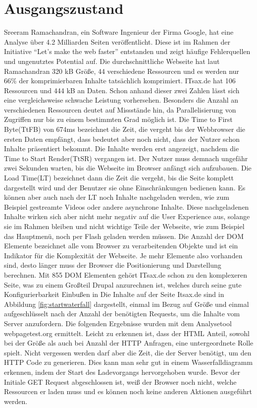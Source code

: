 \section{Ausgangszustand}  
Sreeram Ramachandran, ein Software Ingenieur der Firma Google, hat eine Analyse über 4.2 Milliarden Seiten veröffentlicht. Diese ist im Rahmen der Initiative "`Let's make the web faster"' entstanden und zeigt häufige Fehlerquellen und ungenutztes Potential auf. Die durchschnittliche Webseite hat laut Ramachandran 320 kB Größe, 44 verschiedene Ressourcen und es werden nur 66\% der komprimierbaren Inhalte tatsächlich komprimiert.  %
ITsax.de hat 106 Ressourcen und 444 kB an Daten. Schon anhand dieser zwei Zahlen lässt sich eine vergleichsweise schwache Leistung vorhersehen. Besonders die Anzahl an verschiedenen Ressourcen deutet auf Missstände hin, da Parallelisierung von Zugriffen nur bis zu einem bestimmten Grad möglich ist. Die Time to First Byte(TtFB) von 674ms bezeichnet die Zeit, die vergeht bis der Webbrowser die ersten Daten empfängt, dass bedeutet aber noch nicht, dass der Nutzer schon Inhalte präsentiert bekommt. Die Inhalte werden erst angezeigt, nachdem die Time to Start Render(TtSR) vergangen ist. Der Nutzer muss demnach ungefähr zwei Sekunden warten, bis die Webseite im Browser anfängt sich aufzubauen. Die Load Time(LT) bezeichnet dann die Zeit die vergeht, bis die Seite komplett dargestellt wird und der Benutzer sie ohne Einschränkungen bedienen kann. Es können aber auch nach der LT noch Inhalte nachgeladen werden, wie zum Beispiel gestreamte Videos oder andere asynchrone Inhalte. Diese nachgeladenen Inhalte wirken sich aber nicht mehr negativ auf die User Experience aus, solange sie im Rahmen bleiben und nicht wichtige Teile der Webseite, wie zum Beispiel das Hauptmenü, noch per Flash geladen werden müssen. Die Anzahl der DOM Elemente bezeichnet alle vom Browser zu verarbeitenden Objekte und ist ein Indikator für die Komplexität der Webseite. Je mehr Elemente also vorhanden sind, desto länger muss der Browser die Positionierung und Darstellung berechnen. Mit 855 DOM Elementen gehört ITsax.de schon zu den komplexeren Seite, was zu einem Großteil Drupal anzurechnen ist, welches durch seine gute Konfigurierbarkeit Einbußen in    Die Inhalte auf der Seite Itsax.de sind in Abbildung \ref{fig:startwaterfall} dargestellt, einmal im Bezug auf Größe und einmal aufgeschlüsselt nach der Anzahl der benötigten Requests, um die Inhalte vom Server anzufordern. Die folgenden Ergebnisse wurden mit dem Analysetool webpagetest.org ermittelt. Leicht zu erkennen ist, dass der HTML Anteil, sowohl bei der Größe als auch bei Anzahl der HTTP Anfragen, eine untergeordnete Rolle spielt. Nicht vergessen werden darf aber die Zeit, die der Server benötigt, um den HTTP Code zu generieren. Dies kann man sehr gut in einem Wasserfalldiagramm erkennen, indem der Start des Ladevorgangs hervorgehoben wurde. Bevor der Initiale GET Request abgeschlossen ist, weiß der Browser noch nicht, welche Ressourcen er laden muss und es können noch keine anderen Aktionen ausgeführt werden.
